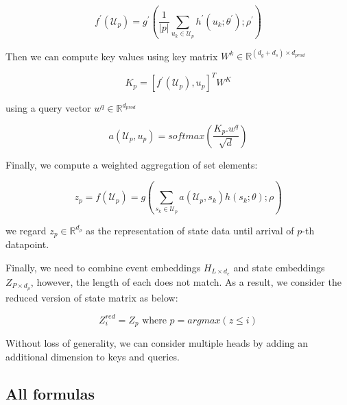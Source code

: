 \documentclass[journal,twoside,web]{ieeecolor}
\begin{document}
\begin{equation}
    f^{\prime}(\mathcal{U}_p) = g^{\prime} \left(  \frac{1}{|p|} \sum_{u_k \in \mathcal{U}_p}  h^{\prime}(u_k;\theta^{\prime}) ;\rho^{\prime}\right) 
\end{equation}

Then we can compute key values using key matrix $W^k \in \mathbb{R}^{(d_g+d_s) \times d_{prod}}$


\begin{equation}
    K_p=[f^{\prime}(\mathcal{U}_p), u_p]^T W^K   
\end{equation}

using a query vector $w^q \in \mathbb{R}^{d_{prod}}$

\begin{equation*}
    a(\mathcal{U}_p,u_p)=  softmax(\frac{K_p.w^q}{\sqrt{d}  })
\end{equation*}


Finally, we compute a weighted aggregation of set elements:

\begin{equation*}
    z_p = f(\mathcal{U}_p) =     
    g\left(
    \sum_{s_k \in \mathcal{U}_p}  a(\mathcal{U}_p,s_k)h(s_k;\theta);\rho 
    \right) 
\end{equation*}

we regard $z_p \in \mathbb{R}^{d_{\rho}}$ as the representation of state data until arrival of $p$-th datapoint.


Finally, we need to combine event embeddings $ H_{L \times d_e}$ and state embeddings $Z_{P \times d_{\rho}}$, however, the length of each does not match. As a result, we consider the reduced version of state matrix as below:

\begin{equation*}
    Z^{red}_i=Z_p \text{ where } p=argmax(z \leq i)
\end{equation*}





Without loss of generality, we can consider multiple heads by adding an additional dimension to keys and queries.\\


\subsection{All formulas}

\end{document}
